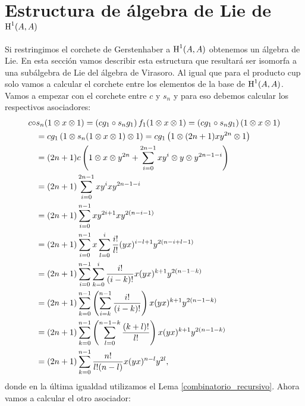 \documentclass[fleqn,../tesis.tex]{subfiles}
\begin{document}
\section{Estructura de álgebra de Lie de $\operatorname{H}^{1}(A, A)$}\label{section_lie}
Si restringimos el corchete de Gerstenhaber a $\operatorname{H}^{1}(A, A)$ obtenemos un álgebra de Lie.
En esta sección vamos describir esta estructura que resultará ser isomorfa a una
subálgebra de Lie del álgebra de Virasoro. Al igual que para el producto cup solo vamos a calcular
el corchete entre los elementos de la base de $\operatorname{H}^{1}(A, A)$. Vamos a empezar con el corchete
entre $c$ y $s_n$ y para eso debemos calcular los respectivos asociadores:
\begin{align*}
	c \circ & s_n(1 \otimes x \otimes 1) =  \left( cg_1 \circ s_n g_ 1\right)f_1(1 \otimes x \otimes 1)
		= \left( cg_1 \circ s_n g_ 1\right)(1 \otimes x \otimes 1)\\
	&= cg_1\left(1 \otimes s_n(1\otimes x \otimes 1) \otimes 1\right) = cg_1\left(1 \otimes (2n + 1)xy^{2n} \otimes 1\right)\\
	&= (2n+1)c\left(1 \otimes x \otimes y^{2n} + \sum_{i = 0}^{2n - 1}xy^i \otimes y \otimes y^{2n -1 -i}\right)\\
	&= (2n + 1)\sum_{i = 0}^{2n - 1}xy^i x y^{2n -1 -i}\\
	&= (2n + 1)\sum_{i = 0}^{n - 1}xy^{2i + 1} x y^{2(n -i -1)}\\
	&=(2n + 1)\sum_{i = 0}^{n - 1}x\sum_{l = 0}^{i}\frac{i!}{l!}(yx)^{i - l + 1}y^{2(n - i + l - 1)}\\
	&=(2n +1)\sum_{i = 0}^{n - 1}\sum_{k = 0}^{i}\frac{i!}{(i - k)!}x(yx)^{k + 1}y^{2(n - 1 -k)}\\
	&=(2n + 1)\sum_{k = 0}^{n -1}
		\left(\sum_{i = k}^{n - 1}\frac{i!}{(i - k)!}\right)x(yx)^{k + 1}y^{2(n - 1 - k)}\\
	&=(2n + 1)\sum_{k = 0}^{n -1}
		\left(\sum_{l = 0}^{n - 1 - k}\frac{(k + l)!}{l!}\right)x(yx)^{k + 1}y^{2(n - 1 - k)}\\
	&=(2n + 1)\sum_{k = 0}^{n -1}\frac{n!}{l!(n - l)} x(yx)^{n - l}y^{2l},
\end{align*}
donde en la última igualdad utilizamos el Lema \ref{combinatorio_recursivo}.
Ahora vamos a calcular el otro asociador:
\end{document}
